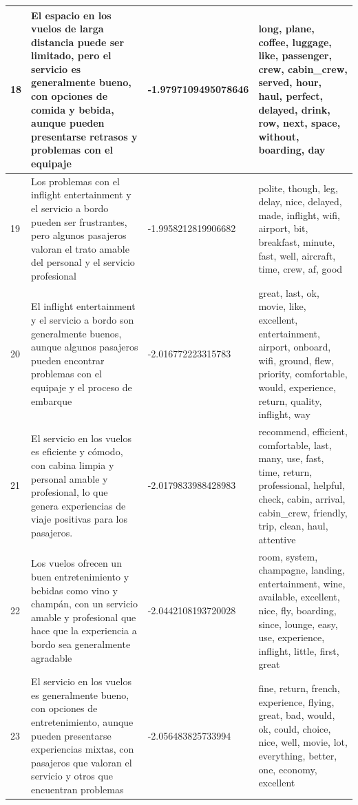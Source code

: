 \documentclass{report}
\begin{document}
\begin{longtable}{|p{1cm}|p{4cm}|p{4cm}|p{6cm}|}
                    \hline
                    18 & El espacio en los vuelos de larga distancia puede ser limitado, pero el servicio es generalmente bueno, con opciones de comida y bebida, aunque pueden presentarse retrasos y problemas con el equipaje & -1.9797109495078646 & long, plane, coffee, luggage, like, passenger, crew, cabin\_crew, served, hour, haul, perfect, delayed, drink, row, next, space, without, boarding, day \\
                    \hline
                    19 & Los problemas con el inflight entertainment y el servicio a bordo pueden ser frustrantes, pero algunos pasajeros valoran el trato amable del personal y el servicio profesional & -1.9958212819906682 & polite, though, leg, delay, nice, delayed, made, inflight, wifi, airport, bit, breakfast, minute, fast, well, aircraft, time, crew, af, good \\
                    \hline
                    20 & El inflight entertainment y el servicio a bordo son generalmente buenos, aunque algunos pasajeros pueden encontrar problemas con el equipaje y el proceso de embarque & -2.016772223315783 & great, last, ok, movie, like, excellent, entertainment, airport, onboard, wifi, ground, flew, priority, comfortable, would, experience, return, quality, inflight, way \\
                    \hline
                    21 & El servicio en los vuelos es eficiente y cómodo, con cabina limpia y personal amable y profesional, lo que genera experiencias de viaje positivas para los pasajeros. & -2.0179833988428983 & recommend, efficient, comfortable, last, many, use, fast, time, return, professional, helpful, check, cabin, arrival, cabin\_crew, friendly, trip, clean, haul, attentive \\
                    \hline
                    22 & Los vuelos ofrecen un buen entretenimiento y bebidas como vino y champán, con un servicio amable y profesional que hace que la experiencia a bordo sea generalmente agradable & -2.0442108193720028 & room, system, champagne, landing, entertainment, wine, available, excellent, nice, fly, boarding, since, lounge, easy, use, experience, inflight, little, first, great \\
                    \hline
                    23 & El servicio en los vuelos es generalmente bueno, con opciones de entretenimiento, aunque pueden presentarse experiencias mixtas, con pasajeros que valoran el servicio y otros que encuentran problemas & -2.056483825733994 & fine, return, french, experience, flying, great, bad, would, ok, could, choice, nice, well, movie, lot, everything, better, one, economy, excellent \\

\end{longtable}
\end{document}
